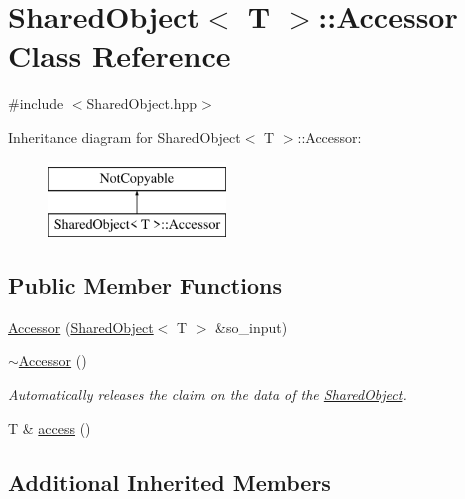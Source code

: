 \hypertarget{class_shared_object_1_1_accessor}{}\section{Shared\+Object$<$ T $>$\+:\+:Accessor Class Reference}
\label{class_shared_object_1_1_accessor}


{\ttfamily \#include $<$Shared\+Object.\+hpp$>$}

Inheritance diagram for Shared\+Object$<$ T $>$\+:\+:Accessor\+:\begin{figure}[H]
\begin{center}
\leavevmode
\includegraphics[height=2.000000cm]{class_shared_object_1_1_accessor}
\end{center}
\end{figure}
\subsection*{Public Member Functions}
\begin{DoxyCompactItemize}
\item 
\hyperlink{class_shared_object_1_1_accessor_a9c11603c72d676e40fabd5ad3add0c0d}{Accessor} (\hyperlink{class_shared_object}{Shared\+Object}$<$ T $>$ \&so\+\_\+input)
\item 
\hypertarget{class_shared_object_1_1_accessor_adb47fcd9988517dc104a48ed6a7288dc}{}\hyperlink{class_shared_object_1_1_accessor_adb47fcd9988517dc104a48ed6a7288dc}{$\sim$\+Accessor} ()\label{class_shared_object_1_1_accessor_adb47fcd9988517dc104a48ed6a7288dc}

\begin{DoxyCompactList}\small\item\em Automatically releases the claim on the data of the \hyperlink{class_shared_object}{Shared\+Object}. \end{DoxyCompactList}\item 
T \& \hyperlink{class_shared_object_1_1_accessor_a151eb8b75d0616f784374808fe9495e7}{access} ()
\end{DoxyCompactItemize}
\subsection*{Additional Inherited Members}


